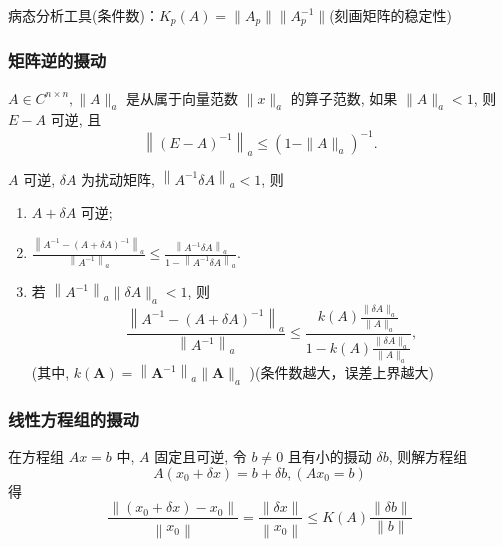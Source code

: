 病态分析工具(条件数)：$K_p(A)=\|A_p\|\|A_p^{-1}\|$(刻画矩阵的稳定性)

\subsubsection{矩阵逆的摄动}
\begin{theorem}
\( A \in C^{n \times n},\|A\|_{a} \) 是从属于向量范数 \( \|x\|_{a} \) 的算子范数, 如果 \( \|A\|_{a}<1 \), 则 \( E - A \) 可逆, 且
\[
\left\|(E -A)^{-1}\right\|_{a} \leq\left(1-\|A\|_{a}\right)^{-1} .
\]
	
\end{theorem}

\begin{theorem}
	\(A \) 可逆, \( \delta A \) 为扰动矩阵, \( \left\|A^{-1} \delta A\right\|_{a}<1 \), 则
	
	\begin{enumerate}
\item \( A+\delta A \) 可逆;
\item \( \frac{\left\|A^{-1}-(A+\delta A)^{-1}\right\|_{a}}{\left\|A^{-1}\right\|_{a}} \leq \frac{\left\|A^{-1} \delta A\right\|_{a}}{1-\left\|A^{-1} \delta A\right\|_{a}} . \)
\item 若 \( \left\|A^{-1}\right\|_{a}\|\delta A\|_{a}<1 \), 则
\[
\frac{\left\|A^{-1}-(A+\delta A)^{-1}\right\|_{a}}{\left\|A^{-1}\right\|_{a}} \leq \frac{k(A) \frac{\|\delta A\|_{a}}{\|A\|_{a}}}{1-k(A) \frac{\|\delta A\|_{a}}{\|A\|_{a}}},
\]
(其中, \( k(\boldsymbol{A})=\left\|\boldsymbol{A}^{-1}\right\|_{a}\|\boldsymbol{A}\|_{a} \) )(条件数越大，误差上界越大)
	\end{enumerate}
\end{theorem}

\subsubsection{线性方程组的摄动}
\begin{theorem}

在方程组 \( {A} {x}={b} \) 中, \( {A} \) 固定且可逆, 令 \( {b} \neq {0} \) 且有小的摄动 \( \delta b \), 则解方程组
\[
 A\left(x_{0}+\delta x\right)=b+\delta b,\left(A x_{0}=b\right)
\] 
得 
\[
 \frac{\left\|\left(x_{0}+\delta x\right)-x_{0}\right\|}{\left\|x_{0}\right\|}=\frac{\|\delta x\|}{\left\|x_{0}\right\|} \leq K(A) \frac{\|\delta b\|}{\|b\|} 
\]

 
	
\end{theorem}

